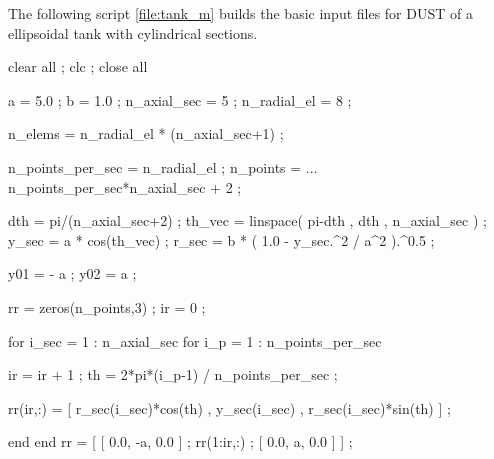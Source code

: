  \noindent
The following script \ref{file:tank_m} builds the basic input files for DUST of a ellipsoidal tank with cylindrical sections.
\begin{inputfile}[frame=single, caption={\opt{tank.m}}, label={file:tank_m}]
%
%
clear all ; clc ; close all

a = 5.0 ; b = 1.0 ; %
n_axial_sec = 5   ; %
n_radial_el = 8   ; %

n_elems = n_radial_el * (n_axial_sec+1) ;

n_points_per_sec = n_radial_el ;
n_points = ...
  n_points_per_sec*n_axial_sec + 2 ; %

dth = pi/(n_axial_sec+2) ;
th_vec = linspace( pi-dth , dth , n_axial_sec ) ;
y_sec = a * cos(th_vec) ; 
r_sec = b * ( 1.0 - y_sec.^2 / a^2 ).^0.5 ;

y01 = - a ; y02 = a ;
 
rr = zeros(n_points,3) ; ir = 0 ;

for i_sec = 1 : n_axial_sec
  for i_p = 1 : n_points_per_sec

    ir = ir + 1 ;
    th = 2*pi*(i_p-1) / n_points_per_sec ;

    rr(ir,:) = [ r_sec(i_sec)*cos(th) , y_sec(i_sec) , r_sec(i_sec)*sin(th) ] ;

  end
end
rr = [ [ 0.0, -a, 0.0 ] ; rr(1:ir,:) ; [ 0.0, a, 0.0 ] ] ; 


\end{inputfile}
